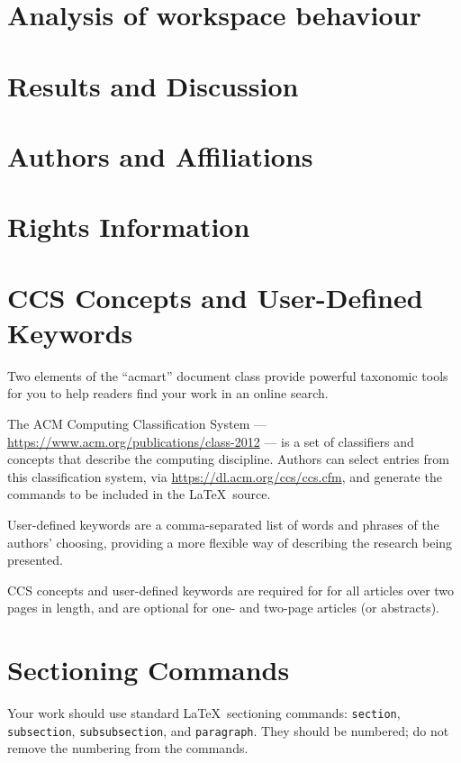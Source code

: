 \documentclass[acmtog]{acmart}
\begin{document}
\section{Analysis of workspace behaviour}



\section{Results and Discussion}



\section{Authors and Affiliations}



\section{Rights Information}



\section{CCS Concepts and User-Defined Keywords}

Two elements of the ``acmart'' document class provide powerful
taxonomic tools for you to help readers find your work in an online
search.

The ACM Computing Classification System ---
\url{https://www.acm.org/publications/class-2012} --- is a set of
classifiers and concepts that describe the computing
discipline. Authors can select entries from this classification
system, via \url{https://dl.acm.org/ccs/ccs.cfm}, and generate the
commands to be included in the \LaTeX\ source.

User-defined keywords are a comma-separated list of words and phrases
of the authors' choosing, providing a more flexible way of describing
the research being presented.

CCS concepts and user-defined keywords are required for for all
articles over two pages in length, and are optional for one- and
two-page articles (or abstracts).

\section{Sectioning Commands}

Your work should use standard \LaTeX\ sectioning commands:
\verb|section|, \verb|subsection|, \verb|subsubsection|, and
\verb|paragraph|. They should be numbered; do not remove the numbering
from the commands.
\end{document}
